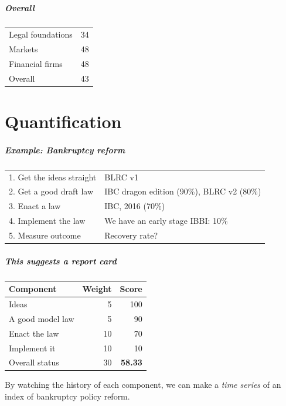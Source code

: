 \documentclass{beamer}
\newcommand{\fullpage}[1]{
\part{#1}
\begin{frame}
  \partpage
\end{frame}
}
\begin{document}
\begin{frame}
  \frametitle{Overall}
  \begin{center}
    \begin{tabular}{lr}
      \hline
      Legal foundations & 34 \\
      Markets & 48 \\
      Financial firms & 48 \\
      \hline
      Overall & 43 \\
      \hline
    \end{tabular}
  \end{center}
\end{frame}

\fullpage{Quantification}

\begin{frame}
  \frametitle{Example: Bankruptcy reform}
  \begin{center}
    \begin{tabular}{l|p{2in}}
      \hline
      1. Get the ideas straight & BLRC v1 \\
      2. Get a good draft law & IBC dragon edition (90\%), BLRC v2 (80\%)  \\
      3. Enact a law & IBC, 2016 (70\%) \\
      4. Implement the law & We have an early stage IBBI: 10\% \\
      5. Measure outcome & Recovery rate? \\
      \hline
    \end{tabular}
  \end{center}
\end{frame}

\begin{frame}
  \frametitle{This suggests a report card}
  \begin{center}
    \begin{tabular}{lrr}
      \hline
      Component & Weight & Score \\
      \hline
      Ideas & 5 & 100 \\
      A good model law & 5 & 90 \\
      Enact the law & 10 & 70 \\
      Implement it & 10 & 10 \\
      \hline
      Overall status & 30 & \textbf{58.33} \\
    \end{tabular}
  \end{center}

  By watching the history of each component, we can make a
  \textit{time series} of an index of bankruptcy policy reform.
\end{frame}
\end{document}
